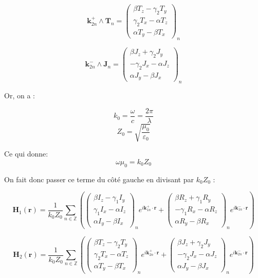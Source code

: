 \documentclass{article}
\begin{document}
\[
\mathbf{k}_{2n}^{+} \wedge \mathbf{T}_n =
\begin{pmatrix}
\beta T_{z} - \gamma_2 T_{y} \\
\gamma_2 T_{x} - \alpha T_{z} \\
\alpha T_{y} - \beta T_{x}
\end{pmatrix}_n
\]

\[
\mathbf{k}_{2n}^{-} \wedge \mathbf{J}_n =
\begin{pmatrix}
\beta J_{z} + \gamma_2 J_{y} \\
- \gamma_2 J_{x} - \alpha J_{z} \\
\alpha J_{y} - \beta J_{x}
\end{pmatrix}_n
\]

Or, on a :

\[
k_0 = \frac{\omega}{c} = \frac{2\pi}{\lambda}
\]
\[
Z_0 = \sqrt{\frac{\mu_0}{\varepsilon_0}} 
\]

Ce qui donne: 
\[
\omega \mu_0 = k_0 Z_0
\]

On fait donc passer ce terme du côté gauche en divisant par \( k_0 Z_0 \) :

\[
\mathbf{H}_1(\mathbf{r}) = \frac{1}{k_0 Z_0} \sum_{n \in \mathbb{Z}} 
\left(
\begin{pmatrix}
\beta I_{z} - \gamma_1 I_{y} \\
\gamma_1 I_{x} - \alpha I_{z} \\
\alpha I_{y} - \beta I_{x}
\end{pmatrix}_n
e^{i \mathbf{k}_{1n}^{+} \cdot \mathbf{r}} +
\begin{pmatrix}
\beta R_{z} + \gamma_1 R_{y} \\
- \gamma_1 R_{x} - \alpha R_{z} \\
\alpha R_{y} - \beta R_{x}
\end{pmatrix}_n
e^{i \mathbf{k}_{1n}^{-} \cdot \mathbf{r}}
\right)
\]

\[
\mathbf{H}_2(\mathbf{r}) = \frac{1}{k_0 Z_0} \sum_{n \in \mathbb{Z}} 
\left(
\begin{pmatrix}
\beta T_{z} - \gamma_2 T_{y} \\
\gamma_2 T_{x} - \alpha T_{z} \\
\alpha T_{y} - \beta T_{x}
\end{pmatrix}_n
e^{i \mathbf{k}_{2n}^{+} \cdot \mathbf{r}} +
\begin{pmatrix}
\beta J_{z} + \gamma_2 J_{y} \\
- \gamma_2 J_{x} - \alpha J_{z} \\
\alpha J_{y} - \beta J_{x}
\end{pmatrix}_n
e^{i \mathbf{k}_{2n}^{-} \cdot \mathbf{r}}
\right)
\]
\end{document}
